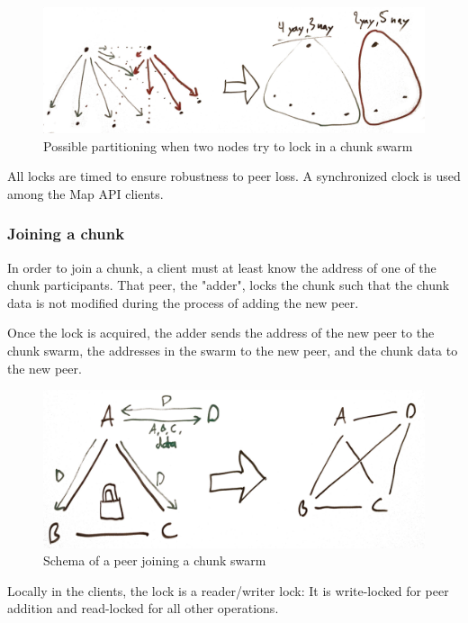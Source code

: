 \documentclass[a4paper, 10pt, conference]{ieeeconf}
\begin{document}
\begin{figure}[H]
  \centering
  \includegraphics[width=\linewidth]{lock-partition.jpg}
  \caption{Possible partitioning when two nodes try to lock in a chunk swarm}
\end{figure}

All locks are timed to ensure robustness to peer loss. A synchronized clock is
used among the Map API clients.

\subsubsection{Joining a chunk}

In order to join a chunk, a client must at least know the address of one of the
chunk participants. That peer, the "adder", locks the chunk such that the chunk
data is not modified during the process of adding the new peer.

Once the lock is acquired, the adder sends the address of the new peer to the
chunk swarm, the addresses in the swarm to the new peer, and the chunk data to
the new peer.

\begin{figure}[H]
  \centering
  \includegraphics[width=\linewidth]{joining.jpg}
  \caption{Schema of a peer joining a chunk swarm}
\end{figure}

Locally in the clients, the lock is a reader/writer lock: It is write-locked
for peer addition and read-locked for all other operations.
\end{document}
